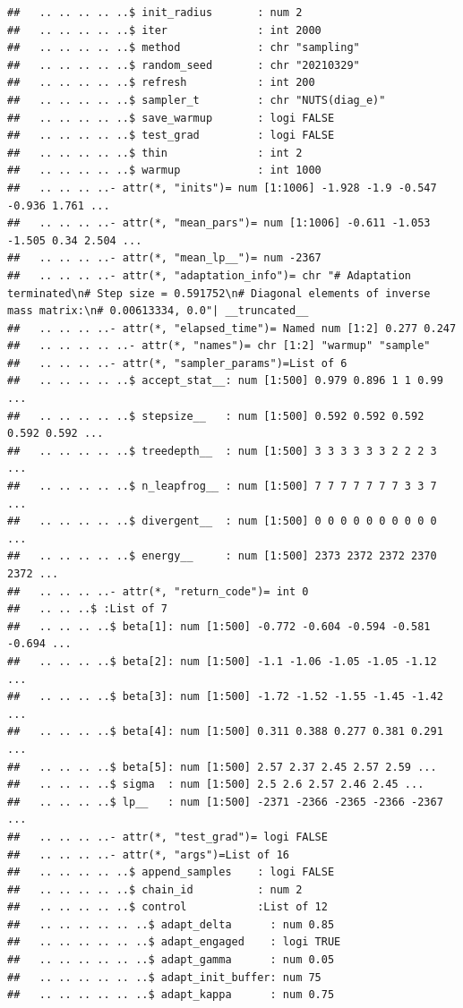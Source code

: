 \documentclass[
  11pt,
]{article}
\begin{document}
\begin{verbatim}
##   .. .. .. .. ..$ init_radius       : num 2
##   .. .. .. .. ..$ iter              : int 2000
##   .. .. .. .. ..$ method            : chr "sampling"
##   .. .. .. .. ..$ random_seed       : chr "20210329"
##   .. .. .. .. ..$ refresh           : int 200
##   .. .. .. .. ..$ sampler_t         : chr "NUTS(diag_e)"
##   .. .. .. .. ..$ save_warmup       : logi FALSE
##   .. .. .. .. ..$ test_grad         : logi FALSE
##   .. .. .. .. ..$ thin              : int 2
##   .. .. .. .. ..$ warmup            : int 1000
##   .. .. .. ..- attr(*, "inits")= num [1:1006] -1.928 -1.9 -0.547 -0.936 1.761 ...
##   .. .. .. ..- attr(*, "mean_pars")= num [1:1006] -0.611 -1.053 -1.505 0.34 2.504 ...
##   .. .. .. ..- attr(*, "mean_lp__")= num -2367
##   .. .. .. ..- attr(*, "adaptation_info")= chr "# Adaptation terminated\n# Step size = 0.591752\n# Diagonal elements of inverse mass matrix:\n# 0.00613334, 0.0"| __truncated__
##   .. .. .. ..- attr(*, "elapsed_time")= Named num [1:2] 0.277 0.247
##   .. .. .. .. ..- attr(*, "names")= chr [1:2] "warmup" "sample"
##   .. .. .. ..- attr(*, "sampler_params")=List of 6
##   .. .. .. .. ..$ accept_stat__: num [1:500] 0.979 0.896 1 1 0.99 ...
##   .. .. .. .. ..$ stepsize__   : num [1:500] 0.592 0.592 0.592 0.592 0.592 ...
##   .. .. .. .. ..$ treedepth__  : num [1:500] 3 3 3 3 3 3 2 2 2 3 ...
##   .. .. .. .. ..$ n_leapfrog__ : num [1:500] 7 7 7 7 7 7 7 3 3 7 ...
##   .. .. .. .. ..$ divergent__  : num [1:500] 0 0 0 0 0 0 0 0 0 0 ...
##   .. .. .. .. ..$ energy__     : num [1:500] 2373 2372 2372 2370 2372 ...
##   .. .. .. ..- attr(*, "return_code")= int 0
##   .. .. ..$ :List of 7
##   .. .. .. ..$ beta[1]: num [1:500] -0.772 -0.604 -0.594 -0.581 -0.694 ...
##   .. .. .. ..$ beta[2]: num [1:500] -1.1 -1.06 -1.05 -1.05 -1.12 ...
##   .. .. .. ..$ beta[3]: num [1:500] -1.72 -1.52 -1.55 -1.45 -1.42 ...
##   .. .. .. ..$ beta[4]: num [1:500] 0.311 0.388 0.277 0.381 0.291 ...
##   .. .. .. ..$ beta[5]: num [1:500] 2.57 2.37 2.45 2.57 2.59 ...
##   .. .. .. ..$ sigma  : num [1:500] 2.5 2.6 2.57 2.46 2.45 ...
##   .. .. .. ..$ lp__   : num [1:500] -2371 -2366 -2365 -2366 -2367 ...
##   .. .. .. ..- attr(*, "test_grad")= logi FALSE
##   .. .. .. ..- attr(*, "args")=List of 16
##   .. .. .. .. ..$ append_samples    : logi FALSE
##   .. .. .. .. ..$ chain_id          : num 2
##   .. .. .. .. ..$ control           :List of 12
##   .. .. .. .. .. ..$ adapt_delta      : num 0.85
##   .. .. .. .. .. ..$ adapt_engaged    : logi TRUE
##   .. .. .. .. .. ..$ adapt_gamma      : num 0.05
##   .. .. .. .. .. ..$ adapt_init_buffer: num 75
##   .. .. .. .. .. ..$ adapt_kappa      : num 0.75

\end{verbatim}
\end{document}
